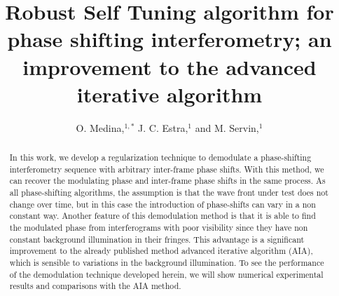 \documentclass[letterpaper,12pt]{article}   %
\begin{document}
\title{Robust Self Tuning algorithm for phase shifting interferometry; an improvement to the advanced iterative algorithm}
\author{O. Medina,$^{1,*}$ J. C. Estra,$^{1}$ and M. Servin,$^{1}$}
\address{$^1$Centro de Investigaciones en \'{O}ptica A. C., Loma del bosque 115, Col. Lomas del Campestre, Le\'{o}n Guanajuato,
37150, M\'{e}xico}
\address{$^*$Corresponding author: orlandomedina@cio.mx}

\maketitle

\begin{abstract}In this work, we develop a regularization technique to demodulate a phase-shifting interferometry sequence with arbitrary inter-frame phase shifts. With this method, we can recover the modulating phase and inter-frame phase shifts in the same process. As all phase-shifting algorithms, the assumption is that the wave front under test does not change over time, but in this case the introduction of phase-shifts can vary in a non constant way. Another feature of this demodulation method is that it is able to find the modulated phase from interferograms with poor visibility since they have non constant background illumination in their fringes. This advantage is a significant improvement to the already published method advanced iterative algorithm (AIA), which is sensible to variations in the background illumination. To see the performance of the demodulation technique developed herein, we will show numerical experimental results and comparisons with the AIA method.
\end{abstract}
\end{document}
